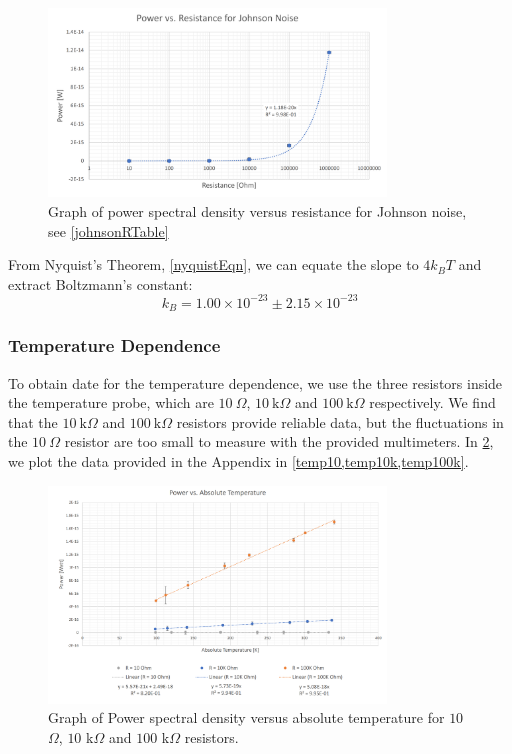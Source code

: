 \documentclass[12pt]{article}
\begin{document}
	\begin{figure}[H]
		\centering
		\includegraphics[width=0.8\textwidth]{powerR.png}
		\caption{Graph of power spectral density versus resistance for Johnson noise, see \cref{johnsonRTable}}
		\label{powerR}
	\end{figure}

	From Nyquist's Theorem, \cref{nyquistEqn}, we can equate the slope to $4k_BT$ and extract Boltzmann's constant:
	\begin{equation}
		k_B = 1.00 \times 10^{-23} \pm 2.15\times 10^{-23}
	\end{equation}
	
	
	
	\subsubsection*{Temperature Dependence}
	To obtain date for the temperature dependence, we use the three resistors inside the temperature probe, which are $10 \ \Omega$, $10 \ \text{k}\Omega$ and $100 \ \text{k}\Omega$ respectively. We find that the $10 \ \text{k}\Omega$ and $100 \ \text{k}\Omega$ resistors provide reliable data, but the fluctuations in the $10 \ \Omega$ resistor are too small to measure with the provided multimeters. In \cref{tempGraphs}, we plot the data provided in the Appendix in \cref{temp10,temp10k,temp100k}.
	
	\begin{figure}[H]
		\centering
		\includegraphics[width=0.8\textwidth]{TempGraph.PNG}
		\caption{Graph of Power spectral density versus absolute temperature for $10$ $\Omega$, $10$ k$\Omega$ and $100$ k$\Omega$ resistors.}
		\label{tempGraphs}
	\end{figure}
\end{document}

